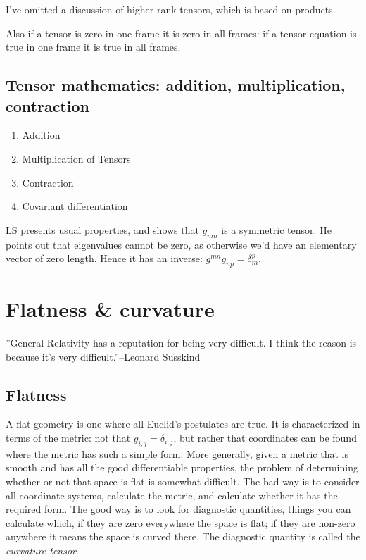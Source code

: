 \documentclass[]{article}
\begin{document}
I've omitted a discussion of higher rank tensors, which is based on products.

Also if a tensor is zero in one frame it is zero in all frames: if a tensor equation is true in one frame it is true in all frames.

\subsection{Tensor mathematics: addition, multiplication, contraction}

\begin{enumerate}
	\item Addition
	\item Multiplication of Tensors
	\item Contraction
	\item Covariant differentiation
\end{enumerate}

LS presents usual properties, and shows that $g_{mn}$ is a symmetric tensor. He points out that eigenvalues cannot be zero, as otherwise we'd have an elementary vector of zero length. Hence it has an inverse: $g^{mn}g_{np}=\delta_m^p$.


\section{Flatness \& curvature}

''General Relativity has a reputation for being very difficult. I think the reason is because it's very difficult.''--Leonard Susskind

\subsection{Flatness}

A flat geometry is one where all Euclid's postulates are true. It is characterized in terms of the metric: not that $g_{i,j} = \delta_{i,j}$, but rather that coordinates can be found where the metric has such a simple form. More generally, given a metric that is smooth and has all the good differentiable properties, the problem of determining whether or not that space is flat is somewhat difficult. The bad way is to consider all coordinate systems, calculate the metric, and calculate whether it has the required form. The good way is to look for diagnostic quantities, things you can calculate which, if they are zero everywhere the space is flat; if they are non-zero anywhere it means the space is curved there. The diagnostic quantity is called the \emph{curvature tensor}.
\end{document}
